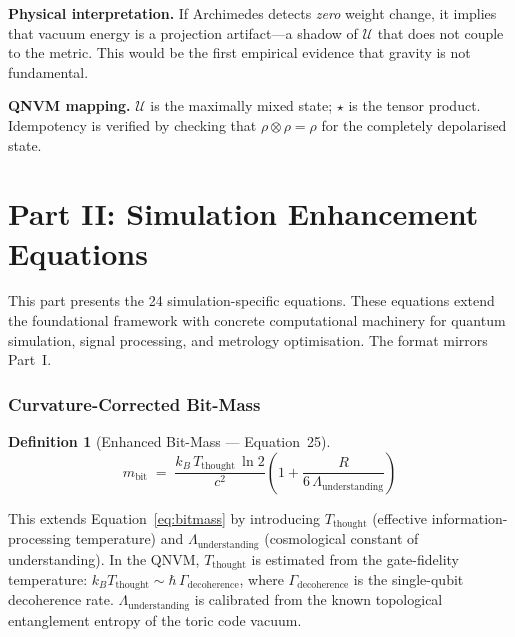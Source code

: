 \documentclass[11pt,a4paper]{article}
\newtheorem{definition}{Definition}[section]
\theoremstyle{remark}
\newcommand{\CalU}{\mathcal{U}}
\begin{document}
\textbf{Physical interpretation.}\quad
If Archimedes detects \emph{zero} weight change, it implies that vacuum energy is a projection artifact---a shadow of $\CalU$ that does not couple to the metric.  This would be the first empirical evidence that gravity is not fundamental.

\textbf{QNVM mapping.}\quad
$\CalU$ is the maximally mixed state; $\star$ is the tensor product.  Idempotency is verified by checking that $\rho \otimes \rho = \rho$ for the completely depolarised state.

\part{Part II: Simulation Enhancement Equations}
\label{part:enhanced}

This part presents the 24 simulation-specific equations.  These equations extend the foundational framework with concrete computational machinery for quantum simulation, signal processing, and metrology optimisation.  The format mirrors Part~I.

\section{Curvature-Corrected Bit-Mass}
\label{sec:eq25}

\begin{definition}[Enhanced Bit-Mass --- Equation~25]
\begin{equation}\label{eq:bitmass_enh}
    m_{\text{bit}} \;=\; \frac{k_B\, T_{\text{thought}}\,\ln 2}{c^2}
        \!\left(1 + \frac{R}{6\,\Lambda_{\text{understanding}}}\right)
\end{equation}
\end{definition}

This extends Equation~\eqref{eq:bitmass} by introducing $T_{\text{thought}}$ (effective information-processing temperature) and $\Lambda_{\text{understanding}}$ (cosmological constant of understanding).  In the QNVM, $T_{\text{thought}}$ is estimated from the gate-fidelity temperature: $k_B T_{\text{thought}} \sim \hbar\,\Gamma_{\text{decoherence}}$, where $\Gamma_{\text{decoherence}}$ is the single-qubit decoherence rate.  $\Lambda_{\text{understanding}}$ is calibrated from the known topological entanglement entropy of the toric code vacuum.
\end{document}

